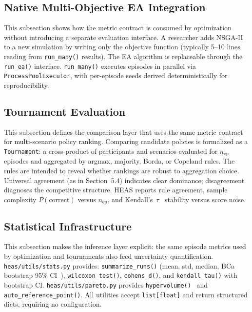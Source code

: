 \documentclass{wscpaperproc}
\begin{document}
\subsection{Native Multi-Objective EA Integration}

This subsection shows how the metric contract is consumed by optimization
without introducing a separate evaluation interface. A researcher adds
NSGA-II to a new simulation by writing only the objective function (typically
5--10 lines reading from \texttt{run\_many()} results). The EA algorithm is
replaceable through the \texttt{run\_ea()} interface. \texttt{run\_many()}
executes episodes in parallel via \texttt{ProcessPoolExecutor}, with per-episode
seeds derived deterministically for reproducibility.

\subsection{Tournament Evaluation}

This subsection defines the comparison layer that uses the same metric contract
for multi-scenario policy ranking. Comparing candidate policies is formalized as a \texttt{Tournament}: a
cross-product of participants and scenarios evaluated for $n_\text{ep}$
episodes and aggregated by argmax, majority, Borda, or Copeland rules. The
rules are intended to reveal whether rankings are robust to aggregation choice.
Universal agreement (as in Section~5.4) indicates clear dominance;
disagreement diagnoses the competitive structure.
HEAS reports rule agreement, sample complexity $P(\text{correct})$ versus
$n_\text{ep}$, and Kendall's~$\tau$~\cite{kendall1938new} stability versus
score noise.

\subsection{Statistical Infrastructure}

This subsection makes the inference layer explicit: the same episode metrics
used by optimization and tournaments also feed uncertainty quantification.
\texttt{heas/utils/stats.py} provides: \texttt{summarize\_runs()} (mean, std,
median, BCa bootstrap 95\% CI~\cite{efron1994bootstrap}),
\texttt{wilcoxon\_test()}, \texttt{cohens\_d()}, and \texttt{kendall\_tau()}
with bootstrap CI. \texttt{heas/utils/pareto.py} provides
\texttt{hypervolume()}~\cite{zitzler1998hypervolume} and
\texttt{auto\_reference\_point()}. All utilities accept \texttt{list[float]}
and return structured dicts, requiring no configuration.
\end{document}
